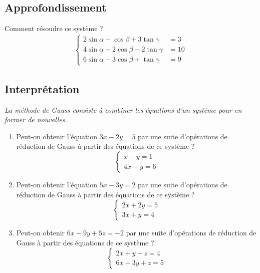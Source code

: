 \documentclass[11pt,a4paper]{report}
\begin{document}
\subsection{Approfondissement}
Comment résoudre ce système ?
\begin{align*}
  \begin{cases}
    2 \sin \alpha-\cos \beta+3 \tan \gamma &= 3 \\
    4 \sin \alpha+2 \cos \beta-2 \tan \gamma &= 10 \\
    6 \sin \alpha-3 \cos \beta+\tan \gamma &= 9
  \end{cases}
\end{align*}

\subsection{Interprétation}

\textit{La méthode de Gauss consiste à combiner les équations d’un système pour en former de nouvelles.}

\medskip
\begin{enumerate}[label=\alph*)]
\item Peut-on obtenir l’équation \(3x - 2y = 5\) par une suite d’opérations de réduction de Gauss à partir des équations de ce système ?
\[
\begin{cases}
x + y = 1 \\
4x - y = 6
\end{cases}
\]

\item Peut-on obtenir l’équation \(5x - 3y = 2\) par une suite d’opérations de réduction de Gauss à partir des équations de ce système ?
\[
\begin{cases}
2x + 2y = 5 \\
3x + y = 4
\end{cases}
\]

\item Peut-on obtenir \(6x - 9y + 5z = -2\) par une suite d’opérations de réduction de Gauss à partir des équations de ce système ?
\[
\begin{cases}
2x + y - z = 4 \\
6x - 3y + z = 5
\end{cases}
\]
\end{enumerate}



\label{LastPage}
\end{document}
